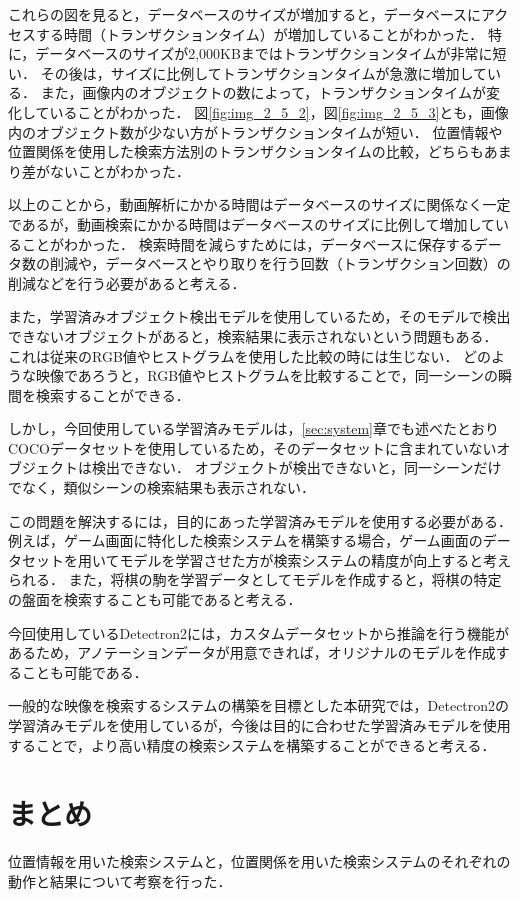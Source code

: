 \documentclass[a4j,12pt,dvipdfmx]{jreport}
\begin{document}
これらの図を見ると，データベースのサイズが増加すると，データベースにアクセスする時間（トランザクションタイム）が増加していることがわかった．
特に，データベースのサイズが2,000KBまではトランザクションタイムが非常に短い．
その後は，サイズに比例してトランザクションタイムが急激に増加している．
また，画像内のオブジェクトの数によって，トランザクションタイムが変化していることがわかった．
図\ref{fig:img_2_5_2}，図\ref{fig:img_2_5_3}とも，画像内のオブジェクト数が少ない方がトランザクションタイムが短い．
位置情報や位置関係を使用した検索方法別のトランザクションタイムの比較，どちらもあまり差がないことがわかった．

以上のことから，動画解析にかかる時間はデータベースのサイズに関係なく一定であるが，動画検索にかかる時間はデータベースのサイズに比例して増加していることがわかった．
検索時間を減らすためには，データベースに保存するデータ数の削減や，データベースとやり取りを行う回数（トランザクション回数）の削減などを行う必要があると考える．

また，学習済みオブジェクト検出モデルを使用しているため，そのモデルで検出できないオブジェクトがあると，検索結果に表示されないという問題もある．
これは従来のRGB値やヒストグラムを使用した比較の時には生じない．
どのような映像であろうと，RGB値やヒストグラムを比較することで，同一シーンの瞬間を検索することができる．

しかし，今回使用している学習済みモデルは，\ref{sec:system}章でも述べたとおりCOCOデータセットを使用しているため，そのデータセットに含まれていないオブジェクトは検出できない．
オブジェクトが検出できないと，同一シーンだけでなく，類似シーンの検索結果も表示されない．

この問題を解決するには，目的にあった学習済みモデルを使用する必要がある．
例えば，ゲーム画面に特化した検索システムを構築する場合，ゲーム画面のデータセットを用いてモデルを学習させた方が検索システムの精度が向上すると考えられる．
また，将棋の駒を学習データとしてモデルを作成すると，将棋の特定の盤面を検索することも可能であると考える．

今回使用しているDetectron2には，カスタムデータセットから推論を行う機能があるため，アノテーションデータが用意できれば，オリジナルのモデルを作成することも可能である．

一般的な映像を検索するシステムの構築を目標とした本研究では，Detectron2の学習済みモデルを使用しているが，今後は目的に合わせた学習済みモデルを使用することで，より高い精度の検索システムを構築することができると考える．

\section{まとめ}\label{chap4-5}
位置情報を用いた検索システムと，位置関係を用いた検索システムのそれぞれの動作と結果について考察を行った．
\end{document}
